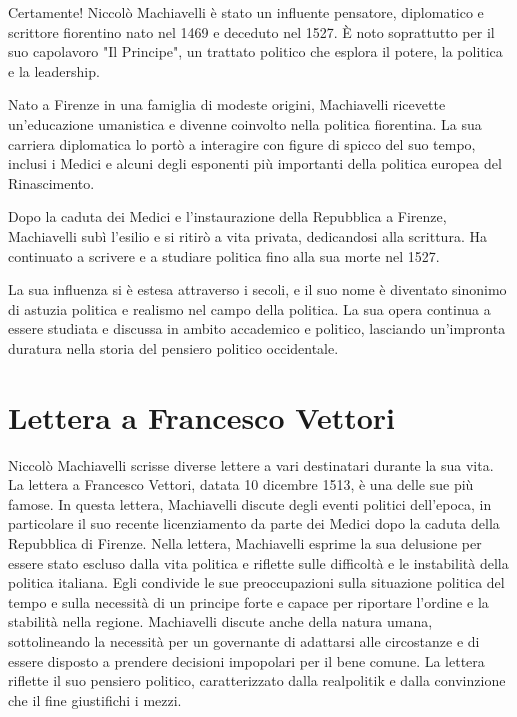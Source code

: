 \documentclass[a4paper]{article}
\begin{document}
Certamente! Niccolò Machiavelli è stato un influente pensatore, diplomatico e scrittore fiorentino nato nel 1469 e deceduto nel 1527. È noto soprattutto per il suo capolavoro "Il Principe", un trattato politico che esplora il potere, la politica e la leadership.

Nato a Firenze in una famiglia di modeste origini, Machiavelli ricevette un'educazione umanistica e divenne coinvolto nella politica fiorentina. La sua carriera diplomatica lo portò a interagire con figure di spicco del suo tempo, inclusi i Medici e alcuni degli esponenti più importanti della politica europea del Rinascimento.

Dopo la caduta dei Medici e l'instaurazione della Repubblica a Firenze, Machiavelli subì l'esilio e si ritirò a vita privata, dedicandosi alla scrittura. Ha continuato a scrivere e a studiare politica fino alla sua morte nel 1527.

La sua influenza si è estesa attraverso i secoli, e il suo nome è diventato sinonimo di astuzia politica e realismo nel campo della politica. La sua opera continua a essere studiata e discussa in ambito accademico e politico, lasciando un'impronta duratura nella storia del pensiero politico occidentale.

\section{Lettera a Francesco Vettori}


Niccolò Machiavelli scrisse diverse lettere a vari destinatari durante la sua vita. La lettera a Francesco Vettori, datata 10 dicembre 1513, è una delle sue più famose. In questa lettera, Machiavelli discute degli eventi politici dell'epoca, in particolare il suo recente licenziamento da parte dei Medici dopo la caduta della Repubblica di Firenze.
Nella lettera, Machiavelli esprime la sua delusione per essere stato escluso dalla vita politica e riflette sulle difficoltà e le instabilità della politica italiana. Egli condivide le sue preoccupazioni sulla situazione politica del tempo e sulla necessità di un principe forte e capace per riportare l'ordine e la stabilità nella regione.
Machiavelli discute anche della natura umana, sottolineando la necessità per un governante di adattarsi alle circostanze e di essere disposto a prendere decisioni impopolari per il bene comune. La lettera riflette il suo pensiero politico, caratterizzato dalla realpolitik e dalla convinzione che il fine giustifichi i mezzi.
\end{document}
